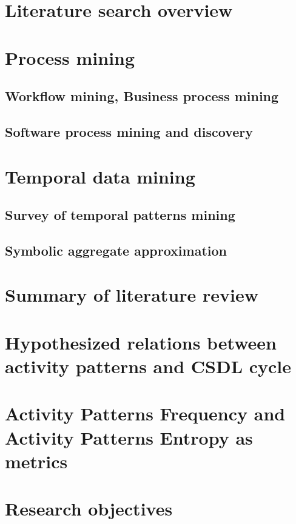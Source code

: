\section{Literature search overview}

\section{Process mining}
\subsection{Workflow mining, Business process mining}
\subsection{Software process mining and discovery}

\section{Temporal data mining}
\subsection{Survey of temporal patterns mining}
\subsection{Symbolic aggregate approximation}

\section{Summary of literature review}

\section{Hypothesized relations between activity patterns and CSDL cycle}

\section{Activity Patterns Frequency and Activity Patterns Entropy as metrics}

\section{Research objectives}